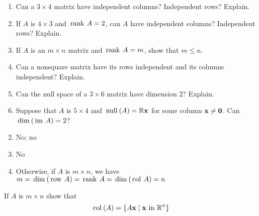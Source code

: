 {{\begin{multicols}{2}
\begin{ex}
\begin{sol}
\begin{enumerate}[label={\alph*.}]
\end{enumerate}
\end{sol}
\end{ex}

\begin{ex}
\begin{enumerate}[label={\alph*.}]
\item Can a $3 \times 4$ matrix have independent columns? \newline Independent rows? Explain.

\item If $A$ is $4 \times 3$ and $\thinspace\operatorname{rank\medspace} A = 2$, can $A$ have independent columns? Independent rows? Explain.

\item If $A$ is an $m \times n$ matrix and $\thinspace\operatorname{rank\medspace} A = m$, show that $m \leq n$.

\item Can a nonsquare matrix have its rows independent and its columns independent? Explain.

\item Can the null space of a $3 \times 6$ matrix have dimension $2$? Explain.

\item Suppose that $A$ is $5 \times 4$ and $\thinspace\operatorname{null\medspace}(A) = \mathbb{R}\textbf{x}$ for some column $\textbf{x} \neq \textbf{0}$. Can $\thinspace\operatorname{dim\medspace}(\thinspace\operatorname{im\medspace} A) = 2$?

\end{enumerate}
\begin{sol}
\begin{enumerate}[label={\alph*.}]
\setcounter{enumi}{1}
\item  No; no 

\setcounter{enumi}{3}
\item No

\setcounter{enumi}{5}
\item  Otherwise, if $A$ is $m \times n$, we have $m = \thinspace\operatorname{dim\medspace}(\thinspace\operatorname{row\medspace} A) = \thinspace\operatorname{rank\medspace} A = \thinspace\operatorname{dim\medspace}(\thinspace\operatorname{col\medspace} A) = n$

\end{enumerate}
\end{sol}
\end{ex}

\begin{ex}
If $A$ is $m \times n$ show that 
\begin{equation*}
\thinspace\operatorname{col\medspace}(A) = \{A\textbf{x} \mid \textbf{x} \mbox{ in }\mathbb{R}^n\}
\end{equation*}


\end{ex}
\end{multicols}}}
